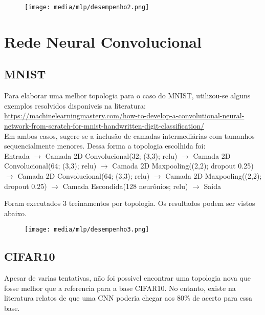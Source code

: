 \documentclass[a4paper]{article}
\begin{document}
\begin{figure}[H]
    \centering   %
    \centerline{\texttt{[image: media/mlp/desempenho2.png]}}
    \label{fig:fig2}  %
\end{figure}


\section{Rede Neural Convolucional}

\subsection{MNIST}

Para elaborar uma melhor topologia para o caso do MNIST, utilizou-se alguns exemplos resolvidos disponiveis na literatura: \\
\tiny
\url{https://machinelearningmastery.com/how-to-develop-a-convolutional-neural-network-from-scratch-for-mnist-handwritten-digit-classification/} \\
\normalsize
Em ambos casos, sugere-se a inclusão de camadas intermediárias com tamanhos sequencialmente menores. Dessa forma a topologia escolhida foi: \\
\break
Entrada $\rightarrow$
Camada 2D Convolucional(32; (3,3); relu) $\rightarrow$
Camada 2D Convolucional(64; (3,3); relu) $\rightarrow$
Camada 2D Maxpooling((2,2); dropout 0.25) $\rightarrow$
Camada 2D Convolucional(64; (3,3); relu) $\rightarrow$
Camada 2D Maxpooling((2,2); dropout 0.25) $\rightarrow$
Camada Escondida(128 neurônios; relu) $\rightarrow$
Saida
\break
\par Foram executados 3 treinamentos por topologia. Os resultados podem ser vistos abaixo.

\begin{figure}[H]
    \centering   %
    \centerline{\texttt{[image: media/mlp/desempenho3.png]}}
    \label{fig:fig2}  %
\end{figure}

\subsection{CIFAR10}

Apesar de varias tentativas, não foi possivel encontrar uma topologia nova que fosse melhor que a referencia para a base CIFAR10. No entanto, existe na literatura relatos de que uma CNN poderia chegar aos 80\% de acerto para essa base.
\end{document}
